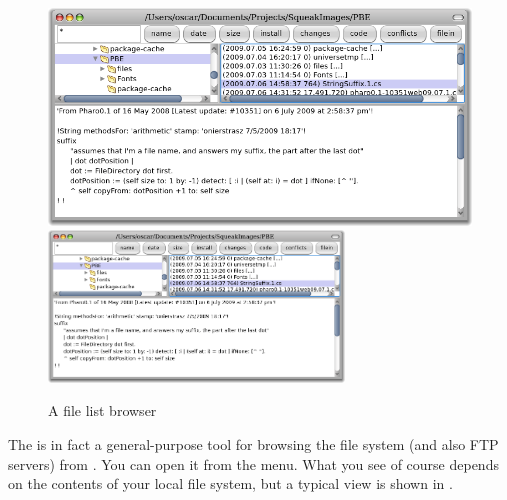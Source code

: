 \documentclass[a4paper,10pt,twoside]{book}
\begin{document}
\begin{figure}[btp]
	\begin{center}
	\ifluluelse
		{\includegraphics[width=\textwidth]{fileList}}
		{\includegraphics[width=0.7\textwidth]{fileList}}
	\end{center}
	\caption{A file list browser}
\end{figure}

The  is in fact a general-purpose tool for browsing the file system (and also FTP servers) from \pharo. 
You can open it from the  menu.
What you see of course depends on the contents of your local file system, but a typical view is shown in .
\end{document}
